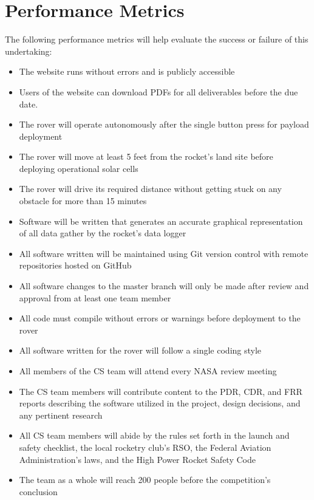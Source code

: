 \documentclass[onecolumn, draftclsnofoot,10pt, compsoc]{IEEEtran}
\begin{document}
\section{Performance Metrics}
The following performance metrics will help evaluate the success or failure of this undertaking:
\begin{itemize}
\item The website runs without errors and is publicly accessible
\item Users of the website can download PDFs for all deliverables before the due date.
\item The rover will operate autonomously after the single button press for payload deployment
\item The rover will move at least 5 feet from the rocket's land site before deploying operational solar cells
\item The rover will drive its required distance without getting stuck on any obstacle for more than 15 minutes
\item Software will be written that generates an accurate graphical representation of all data gather by the rocket's data logger
\item All software written will be maintained using Git version control with remote repositories hosted on GitHub
\item All software changes to the master branch will only be made after review and approval from at least one team member
\item All code must compile without errors or warnings before deployment to the rover
\item All software written for the rover will follow a single coding style
\item All members of the CS team will attend every NASA review meeting
\item The CS team members will contribute content to the PDR, CDR, and FRR reports describing the software utilized in the project, design decisions, and any pertinent research
\item All CS team members will abide by the rules set forth in the launch and safety checklist, the local rocketry club's RSO, the Federal Aviation Administration's laws, and the High Power Rocket Safety Code
\item The team as a whole will reach 200 people before the competition's conclusion
\end{itemize}

\newpage
\nocite{*}%


\end{document}
